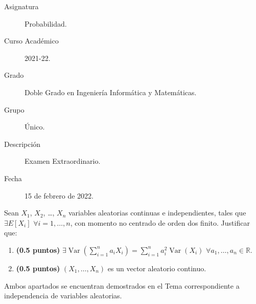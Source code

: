 \documentclass[12pt]{article}
\DeclareMathOperator{\Var}{Var}
\begin{document}

    
    

    \begin{description}
        \item[Asignatura] Probabilidad.
        \item[Curso Académico] 2021-22.
        \item[Grado] Doble Grado en Ingeniería Informática y Matemáticas.
        \item[Grupo] Único.
        \item[Descripción] Examen Extraordinario. 
        \item[Fecha] 15 de febrero de 2022.
    
    \end{description}
    \newpage

    \begin{ejercicio}
        Sean $X_1$, $X_2$, \ldots, $X_n$ variables aleatorias continuas e independientes, tales que $\exists E[X_i]$ $\forall i=1,\ldots,n$, con momento no centrado de orden dos finito. Justificar que:
        \begin{enumerate}
            \item \textbf{(0.5 puntos)} $\exists \Var\left(\sum\limits_{i=1}^{n}a_iX_i\right) = \sum\limits_{i=1}^{n}a_i^2 \Var(X_i)$ $\forall a_1,\ldots,a_n\in \mathbb{R}$.
            \item \textbf{(0.5 puntos)} $(X_1, \ldots, X_n)$ es un vector aleatorio continuo.
        \end{enumerate}

        Ambos apartados se encuentran demostrados en el Tema correspondiente a independencia de variables aleatorias.
    \end{ejercicio}
\end{document}
